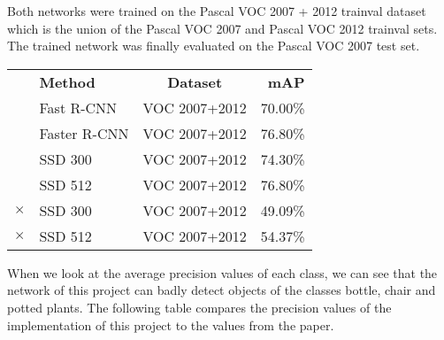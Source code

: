 Both networks were trained on the Pascal VOC 2007 + 2012 trainval dataset which is the union of the Pascal VOC 2007 \cite{voc2007} and Pascal VOC 2012 \cite{voc2012} trainval sets. The trained network was finally evaluated on the Pascal VOC 2007 test set.

\begin{center}
  \begin{tabular}{rl|c|r}
    & \textbf{Method} & \textbf{Dataset} & \textbf{mAP} \\ \cline{2-4}
    & Fast R-CNN & VOC 2007+2012 & 70.00\% \\
    & Faster R-CNN & VOC 2007+2012 & 76.80\% \\ \cline{2-4}
    & SSD 300 & VOC 2007+2012 & 74.30\% \\
    & SSD 512 & VOC 2007+2012 & 76.80\% \\ \cline{2-4}
    $\times$ & SSD 300 & VOC 2007+2012 & 49.09\% \\
    $\times$ & SSD 512 & VOC 2007+2012 & 54.37\%
  \end{tabular}
\end{center}

When we look at the average precision values of each class, we can see that the network of this project can badly detect objects of the classes bottle, chair and potted plants. The following table compares the precision values of the implementation of this project to the values from the paper.

